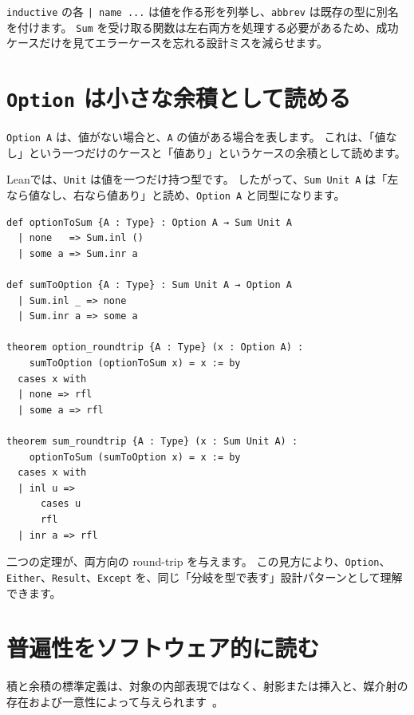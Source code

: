 \texttt{inductive} の各 \texttt{| name ...} は値を作る形を列挙し、\texttt{abbrev} は既存の型に別名を付けます。
\texttt{Sum} を受け取る関数は左右両方を処理する必要があるため、成功ケースだけを見てエラーケースを忘れる設計ミスを減らせます。

\section{\texttt{Option} は小さな余積として読める}

\texttt{Option A} は、値がない場合と、\texttt{A} の値がある場合を表します。
これは、「値なし」という一つだけのケースと「値あり」というケースの余積として読めます。

Leanでは、\texttt{Unit} は値を一つだけ持つ型です。
したがって、\texttt{Sum Unit A} は「左なら値なし、右なら値あり」と読め、\texttt{Option A} と同型になります。

\begin{listing}[htbp]
\begin{verbatim}
def optionToSum {A : Type} : Option A → Sum Unit A
  | none   => Sum.inl ()
  | some a => Sum.inr a

def sumToOption {A : Type} : Sum Unit A → Option A
  | Sum.inl _ => none
  | Sum.inr a => some a

theorem option_roundtrip {A : Type} (x : Option A) :
    sumToOption (optionToSum x) = x := by
  cases x with
  | none => rfl
  | some a => rfl

theorem sum_roundtrip {A : Type} (x : Sum Unit A) :
    optionToSum (sumToOption x) = x := by
  cases x with
  | inl u =>
      cases u
      rfl
  | inr a => rfl
\end{verbatim}
\caption{\texttt{Option A} と \texttt{Sum Unit A}}
\label{lst:ch13_option_sum}
\end{listing}

二つの定理が、両方向の round-trip を与えます。
この見方により、\texttt{Option}、\texttt{Either}、\texttt{Result}、\texttt{Except} を、同じ「分岐を型で表す」設計パターンとして理解できます。

\section{普遍性をソフトウェア的に読む}

積と余積の標準定義は、対象の内部表現ではなく、射影または挿入と、媒介射の存在および一意性によって与えられます~\cite{leinster-basic-category-theory,riehl-category-theory-in-context}。
\label{sec:ch13-universal-property}

